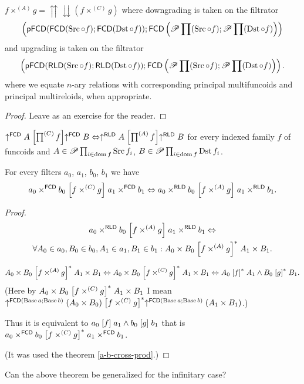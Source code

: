 \begin{cor}
$f\times^{(A)}g=\upuparrows\downdownarrows(f\times^{(C)}g)$ where
downgrading is taken on the filtrator 
\[
\left(\mathsf{pFCD}(\mathsf{FCD}(\operatorname{Src}\circ f);\mathsf{FCD}(\operatorname{Dst}\circ f));\mathsf{FCD}\left(\mathscr{P}\prod(\operatorname{Src}\circ f);\mathscr{P}\prod(\operatorname{Dst}\circ f)\right)\right)
\]
and upgrading is taken on the filtrator 
\[
\left(\mathsf{pFCD}(\mathsf{RLD}(\operatorname{Src}\circ f);\mathsf{RLD}(\operatorname{Dst}\circ f));\mathsf{FCD}\left(\mathscr{P}\prod(\operatorname{Src}\circ f);\mathscr{P}\prod(\operatorname{Dst}\circ f)\right)\right).
\]
where we equate $n$-ary relations with corresponding principal multifuncoids
and principal multireloids, when appropriate.\end{cor}
\begin{proof}
Leave as an exercise for the reader.\end{proof}
\begin{conjecture}
$\uparrow^{\mathsf{FCD}}A\mathrel{\left[\prod^{(C)}f\right]}\uparrow^{\mathsf{FCD}}B\Leftrightarrow\uparrow^{\mathsf{RLD}}A\mathrel{\left[\prod^{(A)}f\right]}\uparrow^{\mathsf{RLD}}B$
for every indexed family $f$ of funcoids and $A\in\mathscr{P}\prod_{i\in\operatorname{dom} f}\operatorname{Src} f_{i}$,
$B\in\mathscr{P}\prod_{i\in\operatorname{dom} f}\operatorname{Dst} f_{i}$.\end{conjecture}
\begin{thm}
For every filters $a_{0}$, $a_{1}$, $b_{0}$, $b_{1}$ we have 
\[
a_{0}\times^{\mathsf{FCD}}b_{0}\mathrel{\left[f\times^{(C)}g\right]}a_{1}\times^{\mathsf{FCD}}b_{1}\Leftrightarrow a_{0}\times^{\mathsf{RLD}}b_{0}\mathrel{\left[f\times^{(A)}g\right]}a_{1}\times^{\mathsf{RLD}}b_{1}.
\]
\end{thm}
\begin{proof}
~
\begin{multline*}
a_{0}\times^{\mathsf{RLD}}b_{0}\mathrel{\left[f\times^{(A)}g\right]}a_{1}\times^{\mathsf{RLD}}b_{1}\Leftrightarrow\\
\forall A_{0}\in a_{0},B_{0}\in b_{0},A_{1}\in a_{1},B_{1}\in b_{1}:A_{0}\times B_{0}\mathrel{\left[f\times^{(A)}g\right]^{\ast}}A_{1}\times B_{1}.
\end{multline*}


\[
A_{0}\times B_{0}\mathrel{\left[f\times^{(A)}g\right]^{\ast}}A_{1}\times B_{1}\Leftrightarrow A_{0}\times B_{0}\mathrel{\left[f\times^{(C)}g\right]^{\ast}}A_{1}\times B_{1}\Leftrightarrow A_{0}\mathrel{\left[f\right]^{\ast}}A_{1}\land B_{0}\mathrel{\left[g\right]^{\ast}}B_{1}.
\]
(Here by $A_{0}\times B_{0}\mathrel{\left[f\times^{(C)}g\right]^{\ast}}A_{1}\times B_{1}$
I mean $\uparrow^{\mathsf{FCD}(\operatorname{Base} a;\operatorname{Base} b)}(A_{0}\times B_{0})\mathrel{\left[f\times^{(C)}g\right]^{\ast}}\uparrow^{\mathsf{FCD}(\operatorname{Base} a;\operatorname{Base} b)}(A_{1}\times B_{1})$.)

Thus it is equivalent to $a_{0}\mathrel{\left[f\right]}a_{1}\wedge b_{0}\mathrel{\left[g\right]}b_{1}$
that is $a_{0}\times^{\mathsf{FCD}}b_{0}\mathrel{\left[f\times^{(C)}g\right]^{\ast}}a_{1}\times^{\mathsf{FCD}}b_{1}$.

(It was used the theorem \ref{a-b-cross-prod}.)
\end{proof}
Can the above theorem be generalized for the infinitary case?


